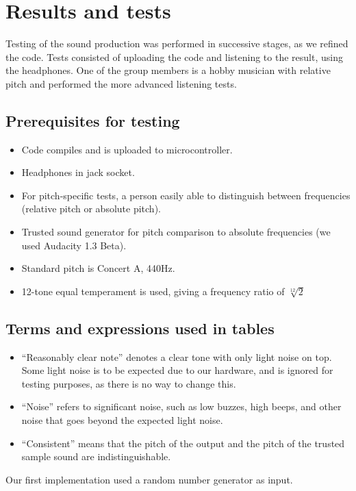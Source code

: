 \section{Results and tests}

Testing of the sound production was performed in successive stages, as
we refined the code. Tests consisted of uploading the code and listening
to the result, using the headphones. One of the group members is a hobby
musician with relative pitch and performed the more advanced listening
tests.

\subsection*{Prerequisites for testing}
\begin{itemize}
\item Code compiles and is uploaded to microcontroller.
\item Headphones in jack socket.
\item For pitch-specific tests, a person easily able to distinguish between frequencies (relative pitch or absolute pitch).
\item Trusted sound generator for pitch comparison to absolute frequencies (we used Audacity 1.3 Beta).
\item Standard pitch is Concert A, 440Hz.
\item 12-tone equal temperament is used, giving a frequency ratio of $\sqrt[12]{2}$
\end{itemize}

\subsection*{Terms and expressions used in tables}
\begin{itemize}
\item ``Reasonably clear note'' denotes a clear tone with only light
noise on top. Some light noise is to be expected due to our hardware,
and is ignored for testing purposes, as there is no way to change this.
\item ``Noise'' refers to significant noise, such as low buzzes, high
beeps, and other noise that goes beyond the expected light noise.
\item ``Consistent'' means that the pitch of the output and the
pitch of the trusted sample sound are indistinguishable.
\end{itemize}

Our first implementation used a random number generator as input.
